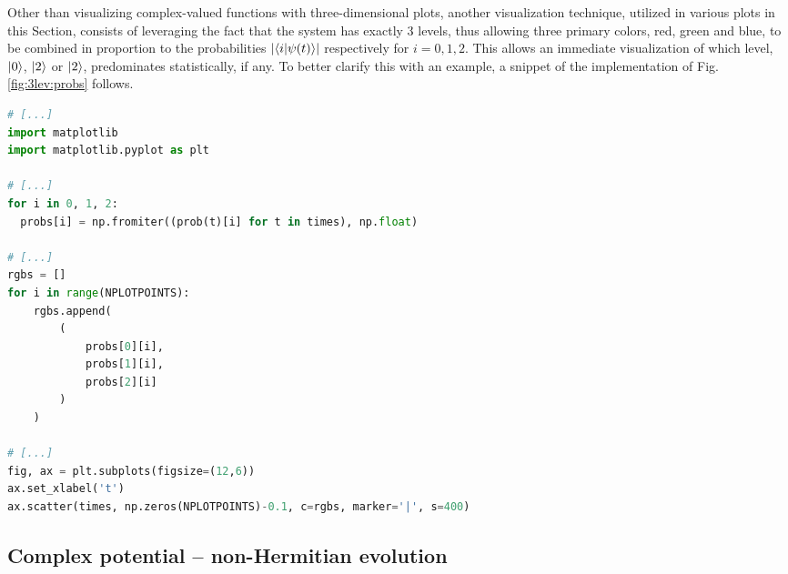 Other than visualizing complex-valued functions with three-dimensional plots,
another visualization technique, utilized in various plots in this Section,
consists of leveraging
the fact that the system has exactly 3 levels,
thus allowing three primary colors, red, green and blue, to be combined
in proportion to the probabilities $\abs{\braket{i}{\psi(t)}}$
respectively for $i = 0, 1, 2$. This allows an immediate visualization
of which level, $\ket{0}$, $\ket{2}$ or $\ket{2}$, predominates statistically, if any.
To better clarify this with an example,
a snippet of the implementation of Fig. \ref{fig:3lev:probs} follows.
\begin{lstlisting}[language=Python]
# [...]
import matplotlib
import matplotlib.pyplot as plt

# [...]
for i in 0, 1, 2:
  probs[i] = np.fromiter((prob(t)[i] for t in times), np.float)

# [...]
rgbs = []
for i in range(NPLOTPOINTS):
    rgbs.append(
        (
            probs[0][i],
            probs[1][i],
            probs[2][i]
        )
    )

# [...]
fig, ax = plt.subplots(figsize=(12,6))
ax.set_xlabel('t')
ax.scatter(times, np.zeros(NPLOTPOINTS)-0.1, c=rgbs, marker='|', s=400)
\end{lstlisting}


\subsection{Complex potential -- non-Hermitian evolution}\label{sec:3lev:complexPotential}

